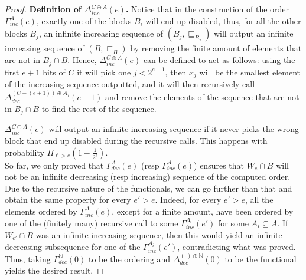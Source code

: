 \documentclass[10pt,a4paper]{amsart}
\newcommand{\NN}[0]{\mathbb{N}}
\begin{document}
\begin{proof}
\textbf{Definition of $\Delta^{C \oplus A}_{inc}(e)$.}
Notice that in the construction of the order $\Gamma^A_{inc}(e)$, exactly one of the blocks $B_i$ will end up disabled, thus, for all the other blocks $B_j$, an infinite increasing sequence of $(B_j, \sqsubseteq_{B_j})$ will output an infinite increasing sequence of $(B, \sqsubseteq_B)$ by removing the finite amount of elements that are not in $B_j \cap B$. Hence, $\Delta^{C \oplus A}_{inc}(e)$ can be defined to act as follows: using the first $e+1$ bits of $C$ it will pick one $j < 2^{e+1}$, then $x_j$ will be the smallest element of the increasing sequence outputted, and it will then recursively call $\Delta^{(C - (e + 1)) \oplus A_j}_{dec}(e+1)$ and remove the elements of the sequence that are not in $B_j \cap B$ to find the rest of the sequence.

$\Delta^{C \oplus A}_{inc}(e)$ will output an infinite increasing sequence if it never picks the wrong block that end up disabled during the recursive calls. This happens with probability $\Pi_{\ell > e} (1 - \frac{1}{2^{\ell}})$. \\

So far, we only proved that $\Gamma^{A}_{dec}(e)$ (resp $\Gamma^{A}_{inc}(e)$) ensures that $W_e \cap B$ will not be an infinite decreasing (resp increasing) sequence of the computed order. Due to the recursive nature of the functionals, we can go further than that and obtain the same property for every $e' > e$. Indeed, for every $e' > e$, all the elements ordered by $\Gamma^{A}_{inc}(e)$, except for a finite amount, have been ordered by one of the (finitely many) recursive call to some $\Gamma^{A_i}_{inc}(e')$ for some $A_i \subseteq A$. If $W_{e'} \cap B$ was an infinite increasing sequence, then this would yield an infinite decreasing subsequence for one of the $\Gamma^{A_i}_{inc}(e')$, contradicting what was proved. \\

Thus, taking $\Gamma_{dec}^{\NN}(0)$ to be the ordering and $\Delta^{(\cdot) \oplus \NN}_{dec}(0)$ to be the functional yields the desired result.
\end{proof}
\end{document}
